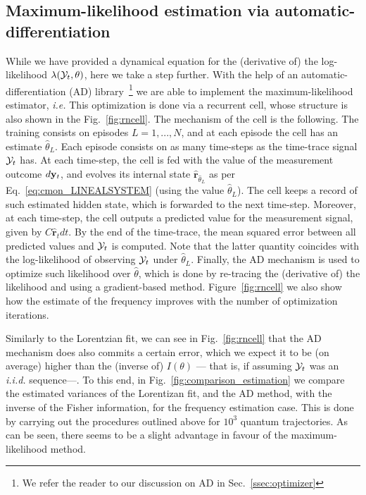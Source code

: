 \subsection{Maximum-likelihood estimation via automatic-differentiation}
While we have provided a dynamical equation for the (derivative of) the log-likelihood $\lambda(\mathcal{Y}_t,\theta)$, here we take a step further. With the help of an automatic-differentiation (AD) library~\cite{abadi2016tensorflow}\footnote{We refer the reader to our discussion on AD in Sec.~\ref{ssec:optimizer}} we are able to implement the maximum-likelihood estimator, \textit{i.e.}
This optimization is done via a recurrent cell, whose structure is also shown in the Fig.~\ref{fig:rncell}. The mechanism of the cell is the following. The training consists on episodes $L=1,...,N$, and at each episode the cell has an estimate $\hat{\theta}_L$. Each episode consists on as many time-steps as the time-trace signal $\mathcal{Y}_t$ has. At each time-step, the cell is fed with the value of the measurement outcome $d\mathbf{y}_t$, and evolves its internal state $\hat{\mathbf{r}}_{\hat{\theta}_L}$
as per Eq.~\ref{eq:cmon_LINEALSYSTEM} (using the value $\hat{\theta}_L$).
  The cell keeps a record of such estimated hidden state, which is forwarded to the next time-step. Moreover, at each time-step, the cell outputs a predicted value for the measurement signal, given by $C \hat{\mathbf{r}}_t dt$. By the end of the time-trace, the mean squared error between all predicted values and $\mathcal{Y}_t$ is computed. Note that the latter quantity coincides with the log-likelihood of observing $\mathcal{Y}_t$ under $\hat{\theta}_L$. Finally, the AD mechanism is used to optimize such likelihood over $\hat{\theta}$, which is done by re-tracing the (derivative of) the likelihood and using a gradient-based method.
  Figure~\ref{fig:rncell} we also show how the estimate of the frequency improves with the number of optimization iterations.

Similarly to the Lorentzian fit, we can see in Fig.~\ref{fig:rncell} that the AD mechanism does also commits a certain error, which we expect it to be (on average) higher than the (inverse of) $I(\theta)$ --- that is, if assuming $\mathcal{Y}_t$ was an \textit{i.i.d.} sequence---. To this end, in Fig.~\ref{fig:comparison_estimation} we compare the estimated variances of the Lorentizan fit, and the AD method, with the inverse of the Fisher information, for the frequency estimation case. This is done by carrying out the procedures outlined above for $10^{3}$ quantum trajectories. As can be seen, there seems to be a slight advantage in favour of the maximum-likelihood method.

